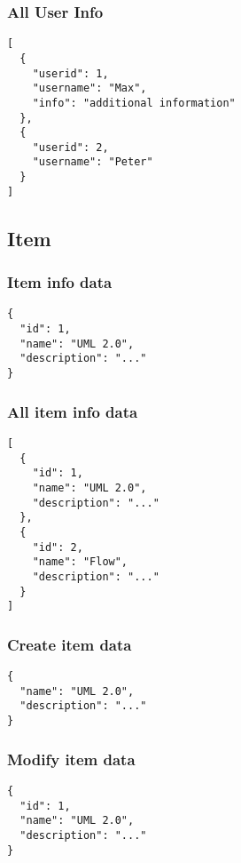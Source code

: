 \subsubsection{All User Info}
\begin{verbatim}
[
  {
    "userid": 1,
    "username": "Max",
    "info": "additional information"
  },
  {
    "userid": 2,
    "username": "Peter"
  }
]
\end{verbatim}
\label{code:user_infos_json}

\subsection{Item}

\subsubsection{Item info data}
\begin{verbatim}
{
  "id": 1,
  "name": "UML 2.0",
  "description": "..."
}
\end{verbatim}
\label{code:item_info_json}

\subsubsection{All item info data}
\begin{verbatim}
[
  {
    "id": 1,
    "name": "UML 2.0",
    "description": "..."
  },
  {
    "id": 2,
    "name": "Flow",
    "description": "..."
  }
]
\end{verbatim}
\label{code:items_info_json}

\subsubsection{Create item data}
\begin{verbatim}
{
  "name": "UML 2.0",
  "description": "..."
}
\end{verbatim}
\label{code:item_create_json}

\subsubsection{Modify item data}
\begin{verbatim}
{
  "id": 1,  
  "name": "UML 2.0",
  "description": "..."
}
\end{verbatim}
\label{code:item_modify_json}

